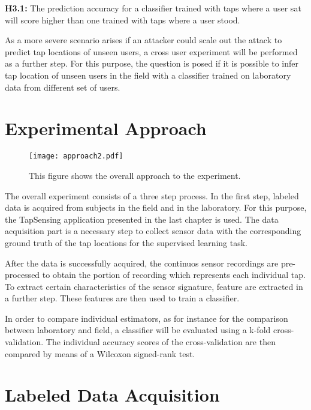 \begin{center}
  \begin{framed}
    \textbf{H3.1:} The prediction accuracy for a classifier trained with taps where a user sat will score higher than one trained with taps where a user stood.
  \end{framed}
\end{center}

As a more severe scenario arises if an attacker could scale out the attack to predict tap locations of unseen users, a cross user experiment will be performed as a further step. For this purpose, the question is posed if it is possible to infer tap location of unseen users in the field with a classifier trained on laboratory data from different set of users.

\section{Experimental Approach}

\begin{figure}[h!]
  \centering
  \texttt{[image: approach2.pdf]}
  \caption{This figure shows the overall approach to the experiment.} \label{fig:appraoch}
\end{figure}

The overall experiment consists of a three step process. In the first step, labeled data is acquired from subjects in the field and in the laboratory. For this purpose, the TapSensing application presented in the last chapter is used. The data acquisition part is a necessary step to collect sensor data with the corresponding ground truth of the tap locations for the supervised learning task. 

After the data is successfully acquired, the continuos sensor recordings are pre-processed to obtain the portion of recording which represents each individual tap. To extract certain characteristics of the sensor signature, feature are extracted in a further step. These features are then used to train a classifier.

In order to compare individual estimators, as for instance for the comparison between laboratory and field, a classifier will be evaluated using a k-fold cross-validation. The individual accuracy scores of the cross-validation are then compared by means of a Wilcoxon signed-rank test.

\section{Labeled Data Acquisition}

